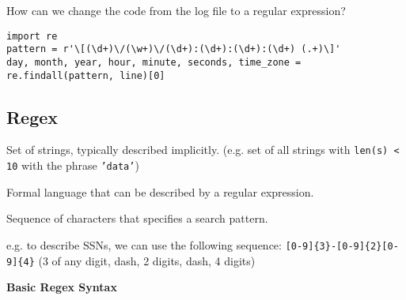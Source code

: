 \begin{example}{How can we change the code from the log file to a regular expression?
\tcbline 
\begin{verbatim}
import re
pattern = r'\[(\d+)\/(\w+)\/(\d+):(\d+):(\d+):(\d+) (.+)\]'
day, month, year, hour, minute, seconds, time_zone = re.findall(pattern, line)[0]
\end{verbatim}
}
\end{example}

\subsection{Regex}
\begin{definition}{Set of strings, typically described implicitly. (e.g. set of all strings with \texttt{len(s) < 10} with the phrase \texttt{'data'})
}
\end{definition}
\begin{definition}{Formal language that can be described by a regular expression.
}
\end{definition}
\begin{definition}{Sequence of characters that specifies a search pattern.

e.g. to describe SSNs, we can use the following sequence: \texttt{[0-9]\{3\}-[0-9]\{2\}[0-9]\{4\}} (3 of any digit, dash, 2 digits, dash, 4 digits)
}
\end{definition}

\textbf{Basic Regex Syntax}

